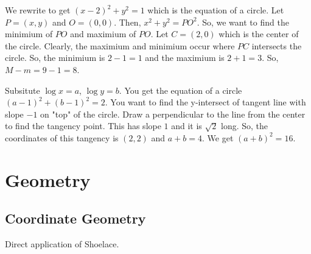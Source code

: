 \documentclass[11pt]{article}
\begin{document}
\begin{sol}
We rewrite to get $(x-2)^2+y^2=1$ which is the equation of a circle. Let $P=(x,y)$ and $O=(0,0)$. Then, $x^2+y^2=PO^2$. So, we want to find the minimium of $PO$ and maximium of $PO$. Let $C=(2,0)$ which is the center of the circle. Clearly, the maximium and minimium occur where $PC$ intersects the circle. So, the minimium is $2-1=1$ and the maximium is $2+1=3$. So, $M-m=9-1=\boxed{8}$.
\end{sol}



\begin{sol} 
Subsitute $\log x =a$, $\log y = b$. You get the equation of a circle $(a-1)^2+(b-1)^2=2$. You want to find the y-intersect of tangent line with slope $-1$ on "top" of the circle. Draw a perpendicular to the line from the center to find the tangency point. This has slope $1$ and it is $\sqrt{2}$ long. So, the coordinates of this tangency is $(2,2)$ and $a+b=4$. We get $(a+b)^2=\boxed{16}$.
\end{sol}


\setcounter{problem}{0}
\section{Geometry}

\subsection{Coordinate Geometry}


\begin{sol} 
Direct application of Shoelace.
\end{sol}

\end{document}
